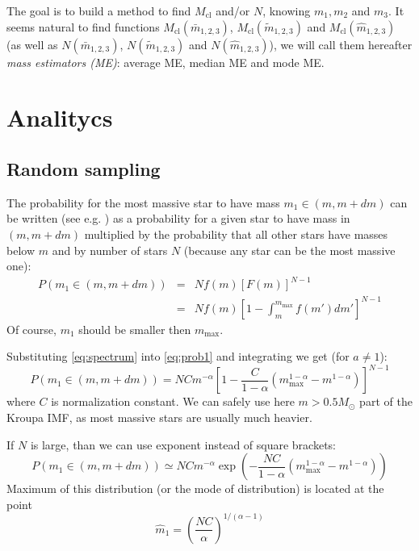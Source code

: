 \documentclass{aastex}
\newcommand{\MSun}{M_\odot}
\newcommand{\Mmax}{m_{\mathrm{max}}}
\newcommand{\Mcl}{M_{\mathrm{cl}}}
\begin{document}
The goal is to build a method to find $\Mcl$ and/or $N$, knowing $m_1, m_2$ and $m_3$.
It seems natural to find functions $\Mcl(\bar{m}_{1,2,3})$, $\Mcl(\tilde{m}_{1,2,3})$ and $\Mcl(\hat{m}_{1,2,3})$ (as well as $N(\bar{m}_{1,2,3})$, $N(\tilde{m}_{1,2,3})$ and $N(\hat{m}_{1,2,3})$), we will call them hereafter \textit{mass estimators (ME)}: average ME, median ME and mode ME. 


\section{Analitycs}
\subsection*{Random sampling}
The probability for the most massive star to have mass $m_1 \in (m, m+dm)$ can be written (see e.g. \citep{OrderStat}) as a probability for a given star to have mass in $(m, m+dm)$ multiplied by the probability that all other stars have masses below $m$ and by number of stars $N$ (because any star can be the most massive one):
\begin{eqnarray}
 P(m_1 \in (m, m+dm)) &=& N f(m) \left[ F(m) \right]^{N-1} \nonumber \\ 
    &=& N f(m) \left[ 1 - \int_m^{\Mmax} f(m')dm' \right]^{N-1} \label{eq:prob1}
\end{eqnarray} 
Of course, $m_1$ should be smaller then $\Mmax$.

Substituting \ref{eq:spectrum} into \ref{eq:prob1} and integrating we get (for $a \neq 1$):
\begin{equation}
  P(m_1 \in (m, m+dm)) = N C m^{-\alpha} \left[ 1 - \frac{C}{1-\alpha} \left( \Mmax^{1-\alpha} - m^{1-\alpha} \right) \right]^{N-1} 
\end{equation} 
where $C$ is normalization constant. We can safely use here $m > 0.5 \MSun$ part of the Kroupa IMF, as most massive stars are usually much heavier.

If $N$ is large, than we can use exponent instead of square brackets:
\begin{equation} \label{eq:p_1st}
 P(m_1 \in (m, m+dm)) \simeq N C m^{-\alpha} \exp \left( -\frac{N C}{1-\alpha} \left( \Mmax^{1-\alpha} - m^{1-\alpha} \right)\right)
\end{equation} 
Maximum of this distribution (or the mode of distribution) is located at the point
\begin{equation}
 \hat{m}_1 = \left(\frac{NC}{\alpha}\right)^{1/(\alpha-1)}
\end{equation} 
\end{document}
